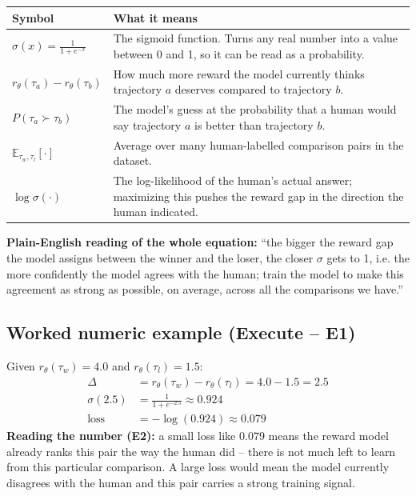 \documentclass[11pt]{article}
\begin{document}
\begin{center}
\begin{tabular}{|>{\raggedright\arraybackslash}p{3.2cm}|>{\raggedright\arraybackslash}p{10.3cm}|}
\hline
\textbf{Symbol} & \textbf{What it means} \\
\hline
$\sigma(x) = \frac{1}{1+e^{-x}}$ & The sigmoid function. Turns any real number
into a value between 0 and 1, so it can be read as a probability. \\
\hline
$r_\theta(\tau_a) - r_\theta(\tau_b)$ & How much more reward the model currently
thinks trajectory $a$ deserves compared to trajectory $b$. \\
\hline
$P(\tau_a \succ \tau_b)$ & The model's guess at the probability that a human would
say trajectory $a$ is better than trajectory $b$. \\
\hline
$\mathbb{E}_{\tau_w,\tau_l}[\cdot]$ & Average over many human-labelled comparison
pairs in the dataset. \\
\hline
$\log \sigma(\cdot)$ & The log-likelihood of the human's actual answer; maximizing
this pushes the reward gap in the direction the human indicated. \\
\hline
\end{tabular}
\end{center}
\textbf{Plain-English reading of the whole equation:} ``the bigger the reward gap
the model assigns between the winner and the loser, the closer $\sigma$ gets to
1, i.e. the more confidently the model agrees with the human; train the model to
make this agreement as strong as possible, on average, across all the
comparisons we have.''

\subsection{Worked numeric example (Execute -- E1)}
Given $r_\theta(\tau_w) = 4.0$ and $r_\theta(\tau_l) = 1.5$:
\begin{align*}
\Delta &= r_\theta(\tau_w) - r_\theta(\tau_l) = 4.0 - 1.5 = 2.5 \\
\sigma(2.5) &= \frac{1}{1+e^{-2.5}} \approx 0.924 \\
\text{loss} &= -\log(0.924) \approx 0.079
\end{align*}
\textbf{Reading the number (E2):} a small loss like $0.079$ means the reward
model already ranks this pair the way the human did -- there is not much left to
learn from this particular comparison. A large loss would mean the model
currently disagrees with the human and this pair carries a strong training
signal.
\end{document}
